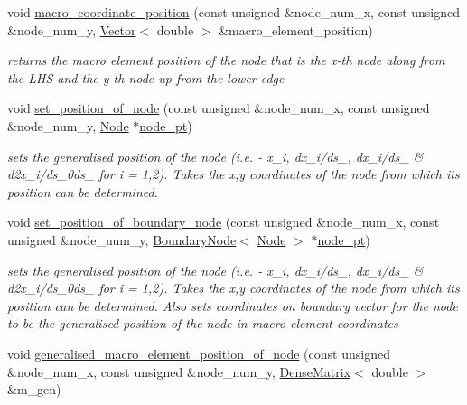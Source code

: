 \begin{DoxyCompactItemize}
\item 
void \hyperlink{classoomph_1_1HermiteQuadMesh_a745a06530e60580e95826bedcf2e3e01}{macro\+\_\+coordinate\+\_\+position} (const unsigned \&node\+\_\+num\+\_\+x, const unsigned \&node\+\_\+num\+\_\+y, \hyperlink{classoomph_1_1Vector}{Vector}$<$ double $>$ \&macro\+\_\+element\+\_\+position)
\begin{DoxyCompactList}\small\item\em returns the macro element position of the node that is the x-\/th node along from the L\+HS and the y-\/th node up from the lower edge \end{DoxyCompactList}\item 
void \hyperlink{classoomph_1_1HermiteQuadMesh_abaac1dedc4a2e578b73b0d849c9a68e8}{set\+\_\+position\+\_\+of\+\_\+node} (const unsigned \&node\+\_\+num\+\_\+x, const unsigned \&node\+\_\+num\+\_\+y, \hyperlink{classoomph_1_1Node}{Node} $\ast$\hyperlink{classoomph_1_1Mesh_aebdb699466fe07f2e27aa4404008cde4}{node\+\_\+pt})
\begin{DoxyCompactList}\small\item\em sets the generalised position of the node (i.\+e. -\/ x\+\_\+i, dx\+\_\+i/ds\+\_, dx\+\_\+i/ds\+\_ \& d2x\+\_\+i/ds\+\_\+0ds\+\_ for i = 1,2). Takes the x,y coordinates of the node from which its position can be determined. \end{DoxyCompactList}\item 
void \hyperlink{classoomph_1_1HermiteQuadMesh_a735fd20f847ac98c5bd5db5196ff3ea4}{set\+\_\+position\+\_\+of\+\_\+boundary\+\_\+node} (const unsigned \&node\+\_\+num\+\_\+x, const unsigned \&node\+\_\+num\+\_\+y, \hyperlink{classoomph_1_1BoundaryNode}{Boundary\+Node}$<$ \hyperlink{classoomph_1_1Node}{Node} $>$ $\ast$\hyperlink{classoomph_1_1Mesh_aebdb699466fe07f2e27aa4404008cde4}{node\+\_\+pt})
\begin{DoxyCompactList}\small\item\em sets the generalised position of the node (i.\+e. -\/ x\+\_\+i, dx\+\_\+i/ds\+\_, dx\+\_\+i/ds\+\_ \& d2x\+\_\+i/ds\+\_\+0ds\+\_ for i = 1,2). Takes the x,y coordinates of the node from which its position can be determined. Also sets coordinates on boundary vector for the node to be the generalised position of the node in macro element coordinates \end{DoxyCompactList}\item 
void \hyperlink{classoomph_1_1HermiteQuadMesh_a17d8992ae7fa8b46b568d156306d3c89}{generalised\+\_\+macro\+\_\+element\+\_\+position\+\_\+of\+\_\+node} (const unsigned \&node\+\_\+num\+\_\+x, const unsigned \&node\+\_\+num\+\_\+y, \hyperlink{classoomph_1_1DenseMatrix}{Dense\+Matrix}$<$ double $>$ \&m\+\_\+gen)

\end{DoxyCompactItemize}
